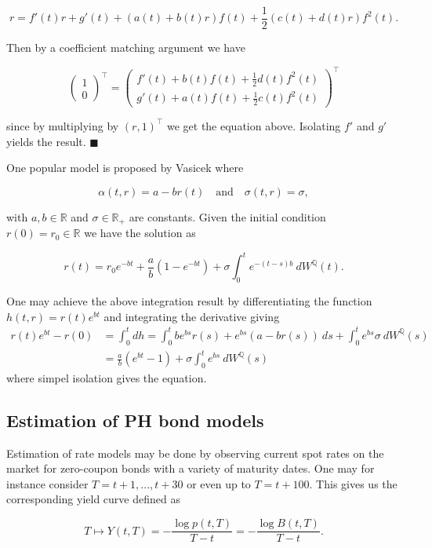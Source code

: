 \documentclass[
]{book}
\begin{document}
\[
 r=f'(t)r+g'(t)+(a(t)+b(t)r)f(t)+\frac{1}{2}(c(t)+d(t)r)f^2(t).
\]

Then by a coefficient matching argument we have

\[
\begin{pmatrix}
1\\ 0
\end{pmatrix}^\top=
\begin{pmatrix}
f'(t)+b(t)f(t)+\frac{1}{2}d(t)f^2(t)\\
g'(t)+a(t)f(t)+\frac{1}{2}c(t)f^2(t)
\end{pmatrix}^\top
\]

since by multiplying by \((r,1)^\top\) we get the equation above. Isolating \(f'\) and \(g'\) yields the result. \(\blacksquare\)

One popular model is proposed by Vasicek where

\[
\alpha(t,r)=a-br(t)\quad \text{and}\quad \sigma(t,r)=\sigma,
\]

with \(a,b\in \mathbb R\) and \(\sigma\in\mathbb R_+\) are constants. Given the initial condition \(r(0)=r_0\in\mathbb R\) we have the solution as

\[
r(t)=r_0e^{-bt}+\frac{a}{b}\left(1-e^{-bt}\right)+\sigma\int_0^t e^{-(t-s)b}\ dW^{\mathbb Q}(t).
\]

One may achieve the above integration result by differentiating the function \(h(t,r)=r(t)e^{bt}\) and integrating the derivative giving
\begin{align*}
r(t)e^{bt}-r(0)&=\int_0^tdh=\int_0^tbe^{bs}r(s)+e^{bs}(a-br(s))\ ds+\int_0^te^{bs}\sigma\ dW^{\mathbb Q}(s)\\
&=\frac{a}{b}(e^{bt}-1)+\sigma\int_0^te^{bs}\ dW^{\mathbb Q}(s)
\end{align*}
where simpel isolation gives the equation.

\hypertarget{estimation-of-ph-bond-models}{%
\subsection{Estimation of PH bond models}\label{estimation-of-ph-bond-models}}

Estimation of rate models may be done by observing current spot rates on the market for zero-coupon bonds with a variety of maturity dates. One may for instance consider \(T=t+1,...,t+30\) or even up to \(T=t+100\). This gives us the corresponding yield curve defined as

\[
T\mapsto Y(t,T)=-\frac{\log p(t,T)}{T-t}=-\frac{\log B(t,T)}{T-t}.
\]
\end{document}

